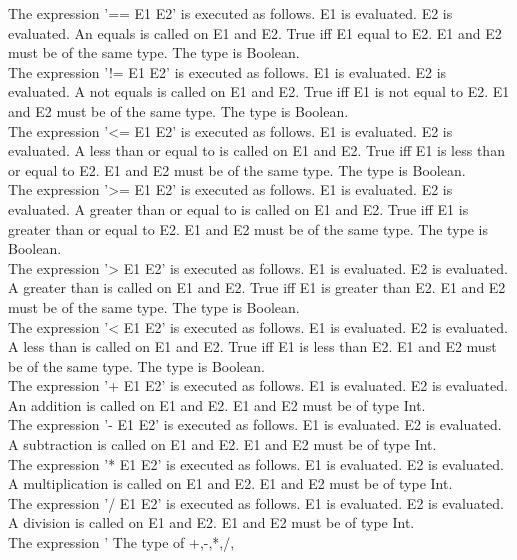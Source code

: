 \documentclass[paper=a4, fontsize=11pt]{article}
\numberwithin{equation}{section}		%
\numberwithin{figure}{section}			%
\numberwithin{table}{section}				%
\begin{document}
The expression '== E1 E2' is executed as follows. E1 is evaluated. E2 is evaluated. An equals is called on E1 and E2. True iff E1 equal to E2. E1 and E2 must be of the same type. The type is Boolean.\\
The expression '!= E1 E2' is executed as follows. E1 is evaluated. E2 is evaluated. A not equals is called on E1 and E2. True iff E1 is not equal to E2. E1 and E2 must be of the same type. The type is Boolean.\\
The expression '<= E1 E2' is executed as follows. E1 is evaluated. E2 is evaluated. A less than or equal to is called on E1 and E2. True iff E1 is less than or equal to E2. E1 and E2 must be of the same type. The type is Boolean.\\
The expression '>= E1 E2' is executed as follows. E1 is evaluated. E2 is evaluated. A greater than or equal to is called on E1 and E2. True iff E1 is greater than or equal to E2. E1 and E2 must be of the same type. The type is Boolean.\\
The expression '> E1 E2' is executed as follows. E1 is evaluated. E2 is evaluated. A greater than is called on E1 and E2. True iff E1 is greater than E2. E1 and E2 must be of the same type. The type is Boolean.\\
The expression '< E1 E2' is executed as follows. E1 is evaluated. E2 is evaluated. A less than is called on E1 and E2. True iff E1 is less than E2. E1 and E2 must be of the same type. The type is Boolean.\\

The expression '+ E1 E2' is executed as follows. E1 is evaluated. E2 is evaluated. An addition is called on E1 and E2. E1 and E2 must be of type Int.\\
The expression '- E1 E2' is executed as follows. E1 is evaluated. E2 is evaluated. A subtraction is called on E1 and E2. E1 and E2 must be of type Int.\\
The expression '* E1 E2' is executed as follows. E1 is evaluated. E2 is evaluated. A multiplication is called on E1 and E2. E1 and E2 must be of type Int.\\
The expression '/ E1 E2' is executed as follows. E1 is evaluated. E2 is evaluated. A division is called on E1 and E2. E1 and E2 must be of type Int.\\
The expression '%
The type of +,-,*,/,%
\end{document}
